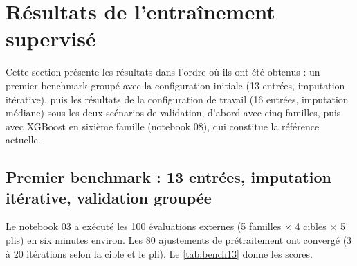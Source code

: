 \clearpage
\section{Résultats de l'entraînement supervisé}
\label{sec:resultats}

Cette section présente les résultats dans l'ordre où ils ont été obtenus : un
premier benchmark groupé avec la configuration initiale (13 entrées, imputation
itérative), puis les résultats de la configuration de travail (16 entrées,
imputation médiane) sous les deux scénarios de validation, d'abord avec cinq
familles, puis avec XGBoost en sixième famille (notebook 08), qui constitue la
référence actuelle.

\subsection{Premier benchmark : 13 entrées, imputation itérative, validation groupée}
\label{subsec:bench13}

Le notebook 03 a exécuté les 100 évaluations externes (5 familles $\times$
4 cibles $\times$ 5 plis) en six minutes environ. Les 80 ajustements de
prétraitement ont convergé (3 à 20 itérations selon la cible et le pli). Le
\cref{tab:bench13} donne les scores.

